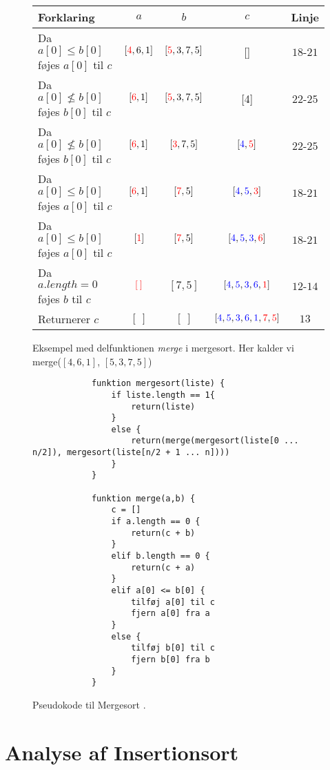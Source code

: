 \begin{figure}
	\begin{center}
		\padtable
		\begin{tabular}{l|c|c|c|c}
			Forklaring & $a$ & $b$ & $c$ & Linje\\
			\hline
			 Da $a[0] \leq b[0]$ føjes $a[0]$ til $c$ & $[\color{red}4\color{black},6,1]$ & $[\color{red}5\color{black},3,7,5]$ & [\:] & $18$-$21$\\
			 Da $a[0] \nleq b[0]$ føjes $b[0]$ til $c$ & $[\color{red}6\color{black},1]$ & $[\color{red}5\color{black},3,7,5]$ & [\color{red}4\color{black}] & $22$-$25$\\
			 Da $a[0] \nleq b[0]$ føjes $b[0]$ til $c$ & $[\color{red}6\color{black},1]$ & $[\color{red}3\color{black},7,5]$ & $[\color{blue}4\color{black},\color{red}5\color{black}]$ & $22$-$25$\\
			 Da $a[0] \leq b[0]$ føjes $a[0]$ til $c$ & $[\color{red}6\color{black},1]$ & $[\color{red}7\color{black},5]$ & $[\color{blue}4\color{black},\color{blue}5\color{black},\color{red}3\color{black}]$ & $18$-$21$\\
			 Da $a[0] \leq b[0]$ føjes $a[0]$ til $c$ & $[\color{red}1\color{black}]$ & $[\color{red}7\color{black},5]$ & $[\color{blue}4\color{black},\color{blue}5\color{black},\color{blue}3\color{black},\color{red}6\color{black}]$ & $18$-$21$\\
			 Da $a.length = 0$ føjes $b$ til $c$ & $\color{red}[\:]\color{black}$ & $[7,5]$ & $[\color{blue}4\color{black},\color{blue}5\color{black},\color{blue}3\color{black},\color{blue}6\color{black},\color{red}1\color{black}]$ & $12$-$14$\\
			 Returnerer $c$ & $[\:]$ & $[\:]$ & $[\color{blue}4\color{black},\color{blue}5\color{black},\color{blue}3\color{black},\color{blue}6\color{black},\color{blue}1\color{black},\color{red}7\color{black},\color{red}5\color{black}]$ & $13$\\
		\end{tabular}
	\end{center}
	\caption{Eksempel med delfunktionen \emph{merge} i mergesort. Her kalder vi merge($[4,6,1]$, $[5,3,7,5]$)}
	\label{fig:}
\end{figure}



\begin{figure}
	\begin{center}
		\begin{lstlisting}
			funktion mergesort(liste) {
				if liste.length == 1{
					return(liste)
				}
				else {
					return(merge(mergesort(liste[0 ... n/2]), mergesort(liste[n/2 + 1 ... n])))	
				}
			}

			funktion merge(a,b) {
				c = []
				if a.length == 0 {
					return(c + b)
				}
				elif b.length == 0 {
					return(c + a)
				}
				elif a[0] <= b[0] {
					tilføj a[0] til c
					fjern a[0] fra a
				}
				else {
					tilføj b[0] til c
					fjern b[0] fra b
				}
			}

		\end{lstlisting}
	\end{center}
	\vspace{-5mm}
	\caption{Pseudokode til Mergesort \cite[s. 106]{aogd}.}
	\label{fig:Pseudokode til mergesort}
\end{figure}




\section{Analyse af Insertionsort}
\label{sec:Analyse af Insertionsort}


